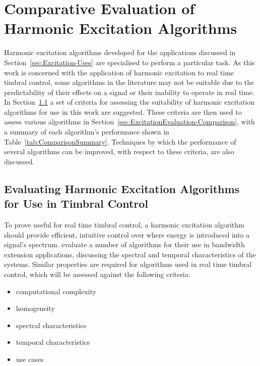 
\chapter{Comparative Evaluation of Harmonic Excitation Algorithms}
\label{chap:ExcitationEvaluation}
	Harmonic excitation algorithms developed for the applications discussed in Section~\ref{sec:Excitation-Uses} are
	specialised to perform a particular task. As this work is concerned with the application of harmonic excitation to
	real time timbral control, some algorithms in the literature may not be suitable due to the predictability of their
	effects on a signal or their inability to operate in real time. In
	Section~\ref{sec:ExcitationEvaluation-Evaluation} a set of criteria for assessing the suitability of harmonic
	excitation algorithms for use in this work are suggested. These criteria are then used to assess various algorithms
	in Section~\ref{sec:ExcitationEvaluation-Comparison}, with a summary of each algorithm's performance shown in
	Table~\ref{tab:ComparisonSummary}. Techniques by which the performance of several algorithms can be improved, with
	respect to these criteria, are also discussed.

\section{Evaluating Harmonic Excitation Algorithms for Use in Timbral Control}
\label{sec:ExcitationEvaluation-Evaluation}
	To prove useful for real time timbral control, a harmonic excitation algorithm should provide efficient, intuitive
	control over where energy is introduced into a signal's spectrum. \citet{larsen2004audio} evaluate a number of
	algorithms for their use in bandwidth extension applications, discussing the spectral and temporal characteristics
	of the systems. Similar properties are required for algorithms used in real time timbral control, which will be
	assessed against the following criteria:

	\begin{itemize}
		\item computational complexity
		\item homogeneity
		\item spectral characteristics
		\item temporal characteristics
		\item use cases
	\end{itemize}

